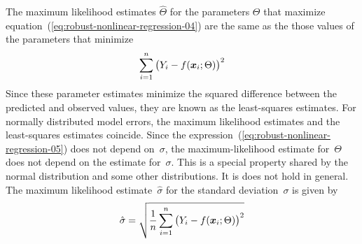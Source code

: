 \documentclass{admbmanual}
\begin{document}
The maximum likelihood estimates $\widehat\Theta$ for the parameters $\Theta$
that maximize
equation~(\ref{eq:robust-nonlinear-regression-04}) %
are the same as the those values of the parameters that minimize
\begin{equation}
  \label{eq:robust-nonlinear-regression-05} %
  \sum_{i=1}^n\big(Y_i-f({\mbox{\boldmath $x$}}_i;\Theta)\big)^2
\end{equation}
Since these parameter estimates minimize the squared difference between the
predicted and observed values, they are known as the least-squares estimates.
For normally distributed model errors, the maximum likelihood estimates and the
least-squares estimates coincide. Since the
expression~(\ref{eq:robust-nonlinear-regression-05}) %
does not depend on~$\sigma$, the maximum-likelihood estimate for~$\Theta$ does
not depend on the estimate for~$\sigma$. This is a special property shared by
the normal distribution and some other distributions. It is does not hold in
general. The maximum likelihood estimate~$\hat\sigma$ for the standard
deviation~$\sigma$ is given by
\begin{equation}
  \label{eq:robust-nonlinear-regression-06} %
  \hat\sigma=\sqrt{\frac{1}{n}
    \sum_{i=1}^n\big(Y_i-f({\mbox{\boldmath $x$}}_i;\Theta)\big)^2}
\end{equation}
\end{document}
